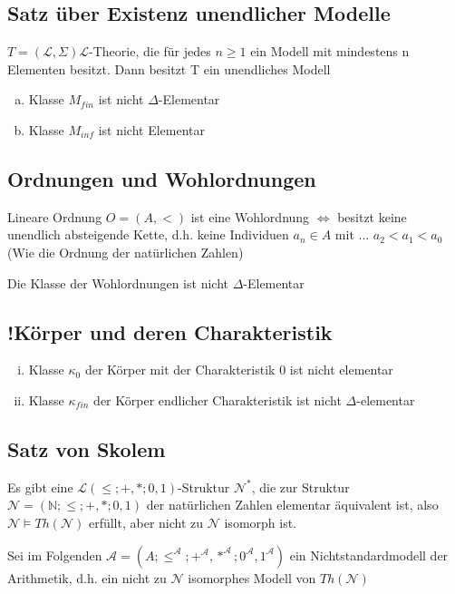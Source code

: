 \documentclass[12pt,a4paper]{article} %
\begin{document}
	
	
	\subsection{Satz über Existenz unendlicher Modelle}
	$T = (\mathcal{L}, \Sigma) \mathcal{L}$-Theorie, die für jedes $n \ge 1$ ein Modell mit mindestens n Elementen besitzt. Dann besitzt T ein unendliches Modell 
	
	\begin{enumerate}[(a)]
		\item Klasse $M_{fin}$ ist nicht $\Delta$-Elementar
		\item Klasse $M_{inf}$ ist nicht Elementar
	\end{enumerate} 

	\subsection{Ordnungen und Wohlordnungen}
	Lineare Ordnung $O = (A, <)$ ist eine Wohlordnung $\Leftrightarrow$ besitzt keine unendlich absteigende Kette, d.h. keine Individuen $a_n \in A$ mit ... $a_2 < a_1 < a_0$ (Wie die Ordnung der natürlichen Zahlen)
	
	Die Klasse der Wohlordnungen ist nicht $\Delta$-Elementar
	
	\subsection{!Körper und deren Charakteristik}
	\begin{enumerate}[(i)]
		\item Klasse $\kappa_0$ der Körper mit der Charakteristik 0 ist nicht elementar
		\item Klasse $\kappa_{fin}$ der Körper endlicher Charakteristik ist nicht $\Delta$-elementar
	\end{enumerate}

	\subsection{Satz von Skolem}
	Es gibt eine $\mathcal{L}(\le; +, *; 0, 1)$-Struktur $\mathcal{N}^*$, die zur Struktur $\mathcal{N} = (\mathbb{N}; \le; +, *; 0, 1)$ der natürlichen Zahlen elementar äquivalent ist, also $\mathcal{N} \vDash Th(\mathcal{N})$ erfüllt, aber nicht zu $\mathcal{N}$ isomorph ist.
	
	Sei im Folgenden $\mathcal{A} = (A; \le^{\mathcal{A}}; +^{\mathcal{A}}, *^{\mathcal{A}}; 0^{\mathcal{A}}, 1^{\mathcal{A}})$ ein Nichtstandardmodell der Arithmetik, d.h. ein nicht zu $\mathcal{N}$ isomorphes Modell von $Th(\mathcal{N})$ 
	
\end{document}
